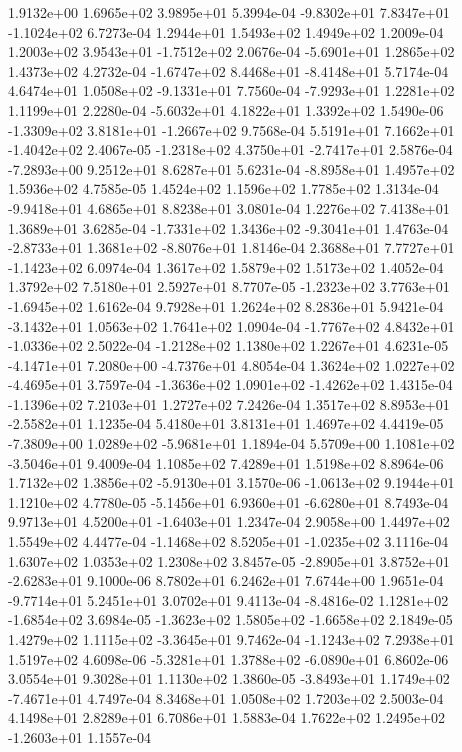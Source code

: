 1.9132e+00 1.6965e+02 3.9895e+01  5.3994e-04
-9.8302e+01  7.8347e+01 -1.1024e+02  6.7273e-04
1.2944e+01 1.5493e+02 1.4949e+02  1.2009e-04
 1.2003e+02  3.9543e+01 -1.7512e+02  2.0676e-04
-5.6901e+01  1.2865e+02  1.4373e+02  4.2732e-04
-1.6747e+02  8.4468e+01 -8.4148e+01  5.7174e-04
 4.6474e+01  1.0508e+02 -9.1331e+01  7.7560e-04
-7.9293e+01  1.2281e+02  1.1199e+01  2.2280e-04
-5.6032e+01  4.1822e+01  1.3392e+02  1.5490e-06
-1.3309e+02  3.8181e+01 -1.2667e+02  9.7568e-04
 5.5191e+01  7.1662e+01 -1.4042e+02  2.4067e-05
-1.2318e+02  4.3750e+01 -2.7417e+01  2.5876e-04
-7.2893e+00  9.2512e+01  8.6287e+01  5.6231e-04
-8.8958e+01  1.4957e+02  1.5936e+02  4.7585e-05
1.4524e+02 1.1596e+02 1.7785e+02  1.3134e-04
-9.9418e+01  4.6865e+01  8.8238e+01  3.0801e-04
1.2276e+02 7.4138e+01 1.3689e+01  3.6285e-04
-1.7331e+02  1.3436e+02 -9.3041e+01  1.4763e-04
-2.8733e+01  1.3681e+02 -8.8076e+01  1.8146e-04
 2.3688e+01  7.7727e+01 -1.1423e+02  6.0974e-04
1.3617e+02 1.5879e+02 1.5173e+02  1.4052e-04
1.3792e+02 7.5180e+01 2.5927e+01  8.7707e-05
-1.2323e+02  3.7763e+01 -1.6945e+02  1.6162e-04
9.7928e+01 1.2624e+02 8.2836e+01  5.9421e-04
-3.1432e+01  1.0563e+02  1.7641e+02  1.0904e-04
-1.7767e+02  4.8432e+01 -1.0336e+02  2.5022e-04
-1.2128e+02  1.1380e+02  1.2267e+01  4.6231e-05
-4.1471e+01  7.2080e+00 -4.7376e+01  4.8054e-04
 1.3624e+02  1.0227e+02 -4.4695e+01  3.7597e-04
-1.3636e+02  1.0901e+02 -1.4262e+02  1.4315e-04
-1.1396e+02  7.2103e+01  1.2727e+02  7.2426e-04
 1.3517e+02  8.8953e+01 -2.5582e+01  1.1235e-04
5.4180e+01 3.8131e+01 1.4697e+02  4.4419e-05
-7.3809e+00  1.0289e+02 -5.9681e+01  1.1894e-04
 5.5709e+00  1.1081e+02 -3.5046e+01  9.4009e-04
1.1085e+02 7.4289e+01 1.5198e+02  8.8964e-06
 1.7132e+02  1.3856e+02 -5.9130e+01  3.1570e-06
-1.0613e+02  9.1944e+01  1.1210e+02  4.7780e-05
-5.1456e+01  6.9360e+01 -6.6280e+01  8.7493e-04
 9.9713e+01  4.5200e+01 -1.6403e+01  1.2347e-04
2.9058e+00 1.4497e+02 1.5549e+02  4.4477e-04
-1.1468e+02  8.5205e+01 -1.0235e+02  3.1116e-04
1.6307e+02 1.0353e+02 1.2308e+02  3.8457e-05
-2.8905e+01  3.8752e+01 -2.6283e+01  9.1000e-06
8.7802e+01 6.2462e+01 7.6744e+00  1.9651e-04
-9.7714e+01  5.2451e+01  3.0702e+01  9.4113e-04
-8.4816e-02  1.1281e+02 -1.6854e+02  3.6984e-05
-1.3623e+02  1.5805e+02 -1.6658e+02  2.1849e-05
 1.4279e+02  1.1115e+02 -3.3645e+01  9.7462e-04
-1.1243e+02  7.2938e+01  1.5197e+02  4.6098e-06
-5.3281e+01  1.3788e+02 -6.0890e+01  6.8602e-06
3.0554e+01 9.3028e+01 1.1130e+02  1.3860e-05
-3.8493e+01  1.1749e+02 -7.4671e+01  4.7497e-04
8.3468e+01 1.0508e+02 1.7203e+02  2.5003e-04
4.1498e+01 2.8289e+01 6.7086e+01  1.5883e-04
 1.7622e+02  1.2495e+02 -1.2603e+01  1.1557e-04
